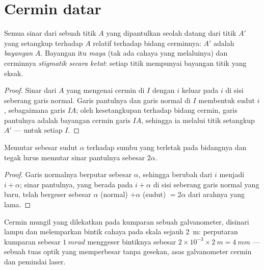 \section{Cermin datar}

\begin{proposition}\label{prop:b1:rays-reflection-refraction:mirror}
Semua sinar dari sebuah titik $A$ yang dipantulkan  seolah
datang dari titik $A'$ yang setangkup terhadap $A$ relatif terhadap
bidang cerminnya: $A'$ adalah \emph{bayangan} $A$. Bayangan itu
\emph{maya} (tak ada cahaya yang melaluinya) dan cerminnya
\emph{stigmatik secara ketat}: setiap titik mempunyai bayangan titik
yang eksak.
\end{proposition}

\begin{proof}
Sinar dari $A$ yang mengenai cermin di $I$ dengan  $i$
keluar pada $i$ di sisi seberang garis normal. Garis pantulnya dan garis
normal di $I$ membentuk sudut $i$, sebagaimana garis $IA$; oleh
kesetangkupan terhadap bidang cermin, garis pantulnya adalah bayangan
cermin garis $IA$, sehingga ia melalui titik setangkup $A'$ --- untuk
setiap $I$.
\end{proof}

\begin{proposition}\label{prop:b1:rays-reflection-refraction:rotation}
Memutar  sebesar sudut $\alpha$ terhadap sumbu yang terletak
pada bidangnya dan tegak lurus  memutar sinar pantulnya
sebesar $2\alpha$.
\end{proposition}

\begin{proof}
Garis normalnya berputar sebesar $\alpha$, sehingga 
berubah dari $i$ menjadi $i + \alpha$; sinar pantulnya, yang berada pada
$i + \alpha$ di sisi seberang garis normal yang baru, telah bergeser
sebesar $\alpha$ (normal) $+ \alpha$ (sudut) $=
2\alpha$ dari arahnya yang lama.
\end{proof}

\begin{example}\label{ex:b1:rays-reflection-refraction:galvanometer}
Cermin mungil yang dilekatkan pada kumparan sebuah galvanometer, disinari
lampu dan melemparkan bintik cahaya pada skala sejauh \qty{2}{m}:
perputaran kumparan sebesar $\qty{1}{mrad}$ menggeser bintiknya sebesar
$2 \times 10^{-3} \times
\qty{2}{m} = \qty{4}{mm}$ --- sebuah tuas optik yang memperbesar tanpa
gesekan, asas galvanometer cermin dan pemindai laser.
\end{example}

